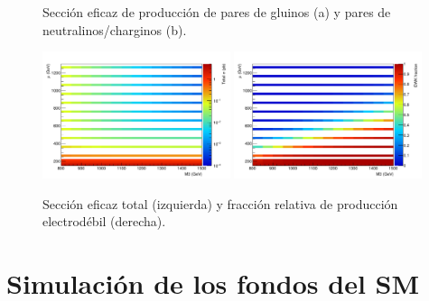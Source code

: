 

\begin{figure}[htbp]
  \centering
  \subfloat[]{%
    \texttt{[image: figures/SigXsec\_strong]}
    \label{fig:signal_xs_strong}
  }
  \subfloat[]{%
    \texttt{[image: figures/SigXsec\_ewk]}
    \label{fig:signal_xs_ewk}
 }
  \caption{Sección eficaz de producción de pares de gluinos (a)
    y pares de neutralinos/charginos (b).}
  \label{fig:signal_xs}
\end{figure}

\begin{figure}[ht!]
  \centering
  \includegraphics[width=0.49\textwidth]{figures/SigXsec_total}
  \includegraphics[width=0.49\textwidth]{figures/SigXsec_ewkFrac}
  \caption{Sección eficaz total (izquierda) y fracción relativa
    de producción electrodébil (derecha).}
  \label{fig:signal_xs_total}
\end{figure}


\section{Simulación de los fondos del SM}
\label{sec:bkg_samples}

